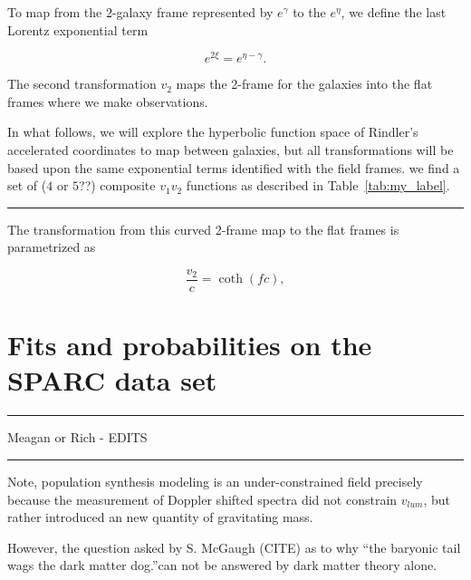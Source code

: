 \documentclass[reprint,%
 amsmath,amssymb,
 aps,
]{revtex4-1}
\begin{document}
To map from the  2-galaxy frame represented by $ e^{\gamma}$ to the $ e^{\eta}$, we define the last   Lorentz exponential term
 

\begin{equation}
    e^{2\xi}=   e^{\eta-\gamma}  .
\end{equation}

 
 
 
 The second transformation  $v_2$ maps the 2-frame for the galaxies into the flat frames where we make observations. 



In what follows, we will explore the hyperbolic function space of  Rindler's accelerated coordinates to map between galaxies, but all transformations will be based upon the same exponential terms identified with the field frames.
 we find a set of ($4$ or $5$??) composite $v_1 v_2$ functions as described in Table~\ref{tab:my_label}.
{\color{pink} \rule{\linewidth}{0.5mm}}


  
  The transformation from this curved 2-frame map to the flat frames is parametrized as 
  
   
  
  \begin{equation}
\frac{v_{2} }{c}=  \coth (fc),
\label{eq:hyperbolico}
\end{equation}


%


  
\section{Fits and probabilities on  the SPARC data set  }
 {\color{red} \rule{\linewidth}{0.5mm}}
 
 {\color{red}Meagan or Rich - EDITS}
 {\color{red} \rule{\linewidth}{0.5mm}}
 
  Note,  population synthesis modeling  is an under-constrained field  precisely because the measurement of Doppler shifted spectra did not constrain $v_{lum}$, but rather introduced    an   new quantity of gravitating mass. 
 
    
However, the question  asked by S. McGaugh (CITE) as to why  ``the   baryonic tail wags the dark matter dog.''can not be answered by dark matter theory alone. 
\end{document}
